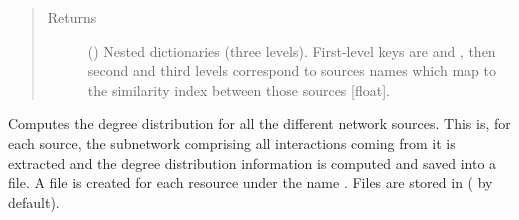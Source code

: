 \documentclass[letterpaper,10pt,english]{sphinxmanual}
\begin{document}
\begin{fulllineitems}
\begin{fulllineitems}
\begin{quote}
\begin{description}
\item[{Returns}] \leavevmode
() \textendash{} Nested dictionaries (three levels). First-level
keys are  and , then second and third
levels correspond to sources names which map to the
similarity index between those sources {[}float{]}.

\end{description}\end{quote}

\end{fulllineitems}


\begin{fulllineitems}
\label{\detokenize{main:pypath.main.PyPath.degree_dist}}
\end{fulllineitems}


\begin{fulllineitems}
\label{\detokenize{main:pypath.main.PyPath.degree_dists}}
Computes the degree distribution for all the different network
sources. This is, for each source, the subnetwork comprising all
interactions coming from it is extracted and the degree
distribution information is computed and saved into a file.
A file is created for each resource under the name
. Files are stored in
 ( by default).

\end{fulllineitems}


\begin{fulllineitems}
\label{\detokenize{main:pypath.main.PyPath.delete_by_source}}
\end{fulllineitems}



\end{fulllineitems}
\end{document}
